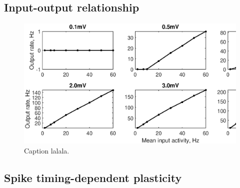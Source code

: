 \documentclass[a4paper,12pt]{report}
\theoremstyle{definition}
\begin{document}
\subsection{Input-output relationship}
\begin{figure}[h]
    \includegraphics[width=\textwidth]{figures/valid_iocurve_vs_epsp_grid.eps}
    \caption{Caption lalala.}
    \label{fig:valid_iocurve_vs_epsp_grid}
\end{figure}




\subsection{Spike timing-dependent plasticity}
\end{document}
